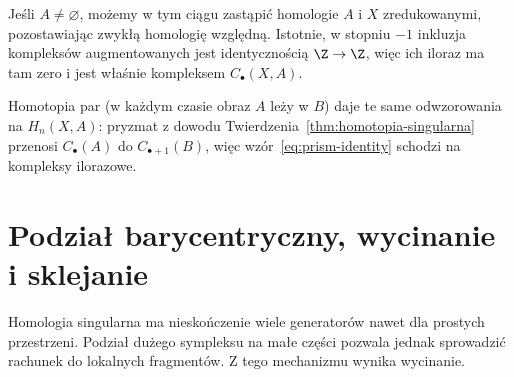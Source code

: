 Jeśli $A\ne\varnothing$, możemy w tym ciągu zastąpić homologie
$A$ i $X$ zredukowanymi, pozostawiając zwykłą homologię względną.
Istotnie, w stopniu $-1$ inkluzja kompleksów augmentowanych
jest identycznością $\Z\to\Z$, więc ich iloraz ma tam zero
i jest właśnie kompleksem $C_\bullet(X,A)$.

Homotopia par (w każdym czasie obraz $A$
leży w $B$) daje te same odwzorowania na $H_n(X,A)$:
pryzmat z dowodu Twierdzenia~\ref{thm:homotopia-singularna}
przenosi $C_\bullet(A)$ do $C_{\bullet+1}(B)$,
więc wzór~\eqref{eq:prism-identity}
schodzi na kompleksy ilorazowe.

\section{Podział barycentryczny, wycinanie i sklejanie}
\label{sec:wycinanie-homologia}

Homologia singularna ma nieskończenie wiele generatorów nawet
dla prostych przestrzeni. Podział dużego sympleksu na małe
części pozwala jednak sprowadzić rachunek do lokalnych
fragmentów. Z tego mechanizmu wynika wycinanie.

